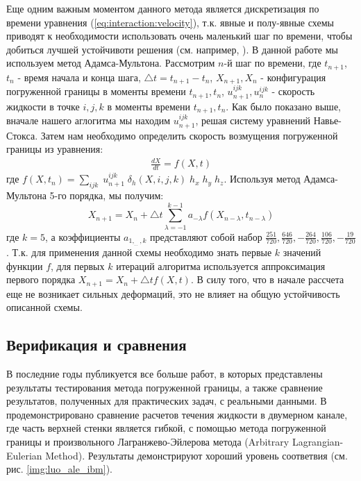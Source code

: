 Еще одним важным моментом данного метода является дискретизация по времени уравнения (\ref{eq:interaction:velocity}),
т.к. явные и полу-явные схемы приводят к необходимости
использовать очень маленький шаг по времени, чтобы добиться лучшей устойчивоти решения (см. например, \cite{griffith2012immersed}).
В данной работе мы используем метод Адамса-Мультона. Рассмотрим $n$-й шаг по времени, где $t_{n+1}$, $t_n$ - время начала и конца шага,
$\triangle t = t_{n+1} - t_n$, $X_{n+1}, X_n$ - конфигурация погруженной границы в моменты времени $t_{n+1}, t_n$,
$u_{n+1}^{ijk}, u_n^{ijk}$ - скорость жидкости в точке $i,j,k$ в моменты времени $t_{n+1}, t_n$.
Как было показано выше, вначале нашего аглогитма мы находим $u_{n+1}^{ijk}$, решая систему уравнений Навье-Стокса.
Затем нам необходимо определить скорость возмущения погруженной границы из уравнения:
\begin{gather}
    \frac{dX}{dt} = f(X, t)
\end{gather}
где $f(X, t_n) = \sum_{ijk}\; u_{n+1}^{ijk} \; \delta_h(X, i, j, k) \; h_x\; h_y\;  h_z$.
Используя метод Адамса-Мультона 5-го порядка, мы получим:
\begin{equation}
    X_{n+1} = X_n + \triangle t \sum_{\lambda=-1}^{k-1} a_{-\lambda} f(X_{n-\lambda}, t_{n-\lambda})
\end{equation}
где $k=5$, а коэффициенты $a_{1, _{\dots}, k}$ представляют собой набор $\frac{251}{720}, \frac{646}{720}, -\frac{264}{720}, \frac{106}{720}, -\frac{19}{720}$.
Т.к. для применения данной схемы необходимо знать первые $k$ значений функции $f$, для первых $k$ итераций алгоритма
используется аппроксимация первого порядка $X_{n+1} = X_n + \triangle t f(X, t)$. В силу того, что в начале рассчета
еще не возникает сильных деформаций, это не влияет на общую устойчивость описанной схемы.

\subsection*{Верификация и сравнения}
В последние годы публикуется все больше работ, в которых представлены результаты тестирования метода погруженной границы,
а также сравнение результатов, полученных для практических задач, с реальными данными. В \cite{luo2012effect} продемонстрировано
сравнение расчетов течения жидкости в двумерном канале, где часть верхней стенки является гибкой, с помощью метода погруженной границы и
произвольного Лагранжево-Эйлерова метода (Arbitrary Lagrangian-Eulerian Method). Результаты демонстрируют хороший уровень соответвия
(см. рис. \ref{img:luo_ale_ibm}).

